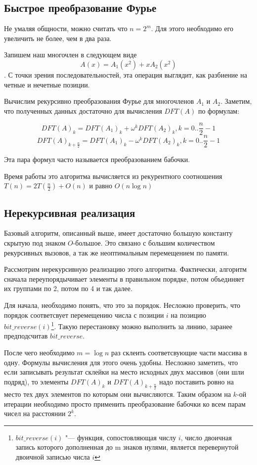 \documentclass[12pt,a4paper]{article}
\theoremstyle{plain}
\begin{document}
\subsection{Быстрое преобразование Фурье}

Не умаляя общности, можно считать что $n = 2^m$. Для этого необходимо его увеличить
не более, чем в два раза.

Запишем наш многочлен в следующем виде $$A(x) = A_1(x^2) + x A_2(x^2)$$.
С точки зрения последовательностей, эта операция выглядит, как разбиение на четные и нечетные позиции.

Вычислим рекурсивно преобразования Фурье для многочленов $A_1$ и $A_2$.
Заметим, что полученных данных достаточно для вычисления $DFT(A)$ по формулам:

$$DFT(A)_k = DFT(A_1)_k + \omega^k DFT(A_2)_k, k = 0..\frac{n}{2}-1$$
$$DFT(A)_{k+\frac{n}{2}} = DFT(A_1)_k - \omega^k DFT(A_2)_k, k = 0..\frac{n}{2}-1$$

Эта пара формул часто называется преобразованием бабочки.

Время работы это алгоритма вычисляется из рекурентного соотношения 
$T(n) = 2T(\frac{n}{2}) + O(n)$ и равно $O(n\log{n})$

\subsection{Нерекурсивная реализация}

Базовый алгоритм, описанный выше, имеет достаточно большую константу скрытую под знаком $O$-большое.
Это связано с большим количеством рекурсивных вызовов, а так же неоптимальным перемещением по памяти.

Рассмотрим нерекурсивную реализацию этого алгоритма.
Фактически, алгоритм сначала переупорядычивает элементы в правильном порядке,
потом объединяет их группами по 2, потом по 4 и так далее.

Для начала, необходимо понять, что это за порядок. Несложно проверить, что порядок соответсвует
перемещению числа с позиции $i$ на позицию $bit\_reverse(i)$\footnote{$bit\_reverse(i)$ "--- функция,
сопостовляющая числу $i$, число двоичная запись которого дополненная до m знаков нулями, является
перевернутой двоичной записью числа $i$}. Такую перестановку можно выполнить за линию,
заранее предподсчитав $bit\_reverse$.

После чего необходимо $m = \log n$ раз склеить соответсвующие части массива в одну.
Формулы вычисления для этого очень удобны. Несложно заметить, что если записывать результат склейки
на место исходных двух массивов (они шли подряд), то элементы $DFT(A)_k$ и $DFT(A)_{k + \frac{n}{2}}$ 
надо поставить ровно на место тех двух элементов по которым они вычисляются. Таким образом
на $k$-ой итерации необходимо просто применить преобразование бабочки ко всем 
парам чисел на расстоянии $2^k$.
\end{document}
